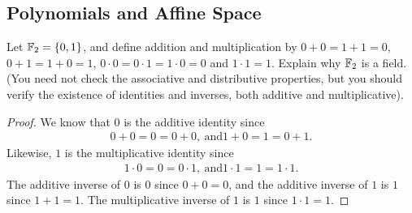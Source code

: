 \subsection{Polynomials and Affine Space}


\begin{exercise}{1}
Let $\mathbb{F}_2 = \{0,1\}$, and define addition and multiplication by $0+0 = 1+1 = 0$, $0+1 = 1+0 = 1$, $0\cdot 0 = 0\cdot 1 = 1\cdot 0 = 0$ and $1\cdot 1 = 1$. 
Explain why $\mathbb{F}_2$ is a field. 
(You need not check the associative and distributive properties, but you should verify the existence of identities and inverses, both additive and multiplicative).
\end{exercise}
\begin{proof}
    We know that $0$ is the additive identity since
    \begin{align*}
        0 + 0 = 0 = 0+0,~\text{and} 1+0 = 1 = 0+1.
    \end{align*}
    Likewise, $1$ is the multiplicative identity since
    \begin{align*}
        1\cdot 0 = 0 = 0\cdot 1,~\text{and} 1\cdot 1 = 1 = 1\cdot 1.
    \end{align*}
   The additive inverse of $0$ is $0$ since $0+0=0$, and the additive inverse of $1$ is $1$ since $1+1=1$. 
   The multiplicative inverse of $1$ is $1$ since $1\cdot 1 = 1$.
\end{proof}


